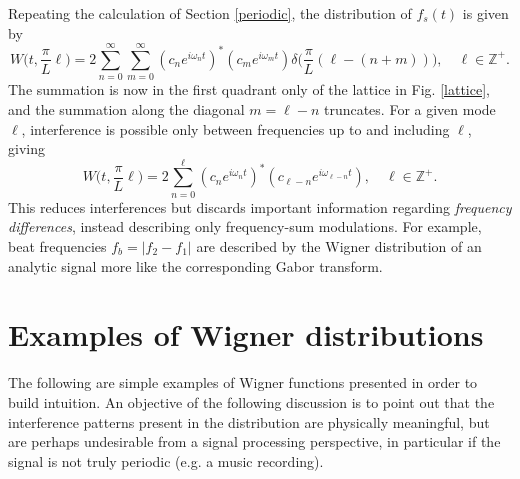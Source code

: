\documentclass{article}
\begin{document}
\begin{appendices}
Repeating the calculation of Section \ref{periodic}, the distribution of $f_s(t)$ is given by \cite{wigner_periodic}
\begin{equation}
  W\Big(t, \frac{\pi}{L}\ell\Big) = 2\sum_{n=0}^\infty\sum_{m=0}^\infty (c_ne^{i\omega_nt})^*(c_me^{i\omega_mt})\delta\Big(\frac{\pi}{L}(\ell - (n+m))\Big),\quad \ell\in\mathbb{Z}^+.
\end{equation}
The summation is now in the first quadrant only of the lattice in Fig. \ref{lattice}, and the summation along the diagonal $m = \ell - n$ truncates. For a given mode $\ell$, interference is possible only between frequencies up to and including $\ell$, giving
\begin{equation}
  W\Big(t, \frac{\pi}{L}\ell\Big) = 2\sum_{n=0}^\ell(c_ne^{i\omega_nt})^*(c_{\ell-n}e^{i\omega_{\ell-n}t}),\quad \ell\in\mathbb{Z}^+.
\end{equation}
This reduces interferences but discards important information regarding \textit{frequency differences}, instead describing only frequency-sum modulations. For example, beat frequencies $f_b = |f_2-f_1|$ are described by the Wigner distribution of an analytic signal more like the corresponding Gabor transform.



\newpage
\section{Examples of Wigner distributions}\label{examples}
The following are simple examples of Wigner functions presented in order to build intuition. An objective of the following discussion is to point out that the interference patterns present in the distribution are physically meaningful, but are perhaps undesirable from a signal processing perspective, in particular if the signal is not truly periodic (e.g. a music recording).


\end{appendices}
\end{document}
